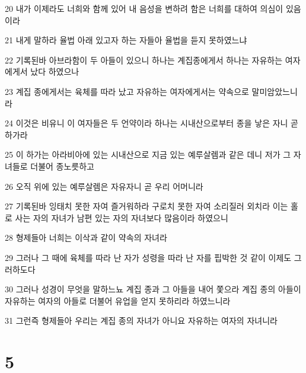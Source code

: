\par 20 내가 이제라도 너희와 함께 있어 내 음성을 변하려 함은 너희를 대하여 의심이 있음이라
\par 21 내게 말하라 율법 아래 있고자 하는 자들아 율법을 듣지 못하였느냐
\par 22 기록된바 아브라함이 두 아들이 있으니 하나는 계집종에게서 하나는 자유하는 여자에게서 났다 하였으나
\par 23 계집 종에게서는 육체를 따라 났고 자유하는 여자에게서는 약속으로 말미암았느니라
\par 24 이것은 비유니 이 여자들은 두 언약이라 하나는 시내산으로부터 종을 낳은 자니 곧 하가라
\par 25 이 하가는 아라비아에 있는 시내산으로 지금 있는 예루살렘과 같은 데니 저가 그 자녀들로 더불어 종노릇하고
\par 26 오직 위에 있는 예루살렘은 자유자니 곧 우리 어머니라
\par 27 기록된바 잉태치 못한 자여 즐거워하라 구로치 못한 자여 소리질러 외치라 이는 홀로 사는 자의 자녀가 남편 있는 자의 자녀보다 많음이라 하였으니
\par 28 형제들아 너희는 이삭과 같이 약속의 자녀라
\par 29 그러나 그 때에 육체를 따라 난 자가 성령을 따라 난 자를 핍박한 것 같이 이제도 그러하도다
\par 30 그러나 성경이 무엇을 말하느뇨 계집 종과 그 아들을 내어 쫓으라 계집 종의 아들이 자유하는 여자의 아들로 더불어 유업을 얻지 못하리라 하였느니라
\par 31 그런즉 형제들아 우리는 계집 종의 자녀가 아니요 자유하는 여자의 자녀니라

\chapter{5}

